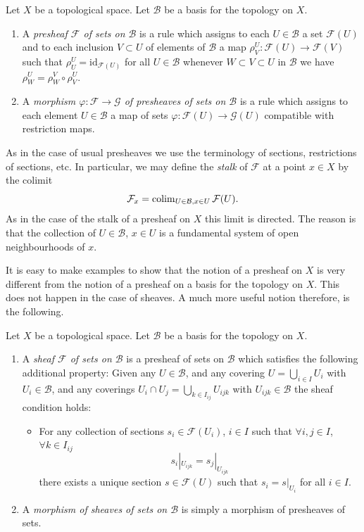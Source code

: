 \begin{definition}
\label{definition-presheaf-basis}
Let $X$ be a topological space. Let $\mathcal{B}$ be a
basis for the topology on $X$.
\begin{enumerate}
\item A {\it presheaf $\mathcal{F}$ of sets on $\mathcal{B}$}
is a rule which assigns to each $U \in \mathcal{B}$ a set
$\mathcal{F}(U)$ and to each inclusion $V \subset U$
of elements of $\mathcal{B}$ a map
$\rho^U_V : \mathcal{F}(U) \to \mathcal{F}(V)$ such that
$\rho^U_U = \text{id}_{\mathcal{F}(U)}$ for all $U \in \mathcal{B}$
whenever $W \subset V \subset U$ in $\mathcal{B}$ we have
$\rho^U_W = \rho^V_W \circ \rho ^U_V$.
\item A {\it morphism $\varphi : \mathcal{F} \to \mathcal{G}$
of presheaves of sets on $\mathcal{B}$} is a rule which assigns to each
element $U \in \mathcal{B}$ a map of sets $\varphi : \mathcal{F}(U)
\to \mathcal{G}(U)$ compatible with restriction maps.
\end{enumerate}
\end{definition}

\noindent
As in the case of usual presheaves we use the terminology of sections,
restrictions of sections, etc. In particular, we may define the
{\it stalk} of $\mathcal{F}$ at a point $x \in X$ by the
colimit
$$
\mathcal{F}_x = \mathop{\mathrm{colim}}\nolimits_{U\in \mathcal{B}, x\in U} \mathcal{F}(U).
$$
As in the case of the stalk of a presheaf on $X$ this limit is
directed. The reason is that the collection of $U\in \mathcal{B}$,
$x \in U$ is a fundamental system of open neighbourhoods of $x$.

\medskip\noindent
It is easy to make examples to show that the notion of a presheaf
on $X$ is very different from the notion of a presheaf on a basis
for the topology on $X$. This does not happen in the case of
sheaves. A much more useful notion therefore, is the following.

\begin{definition}
\label{definition-sheaf-basis}
Let $X$ be a topological space. Let $\mathcal{B}$ be a
basis for the topology on $X$.
\begin{enumerate}
\item A {\it sheaf $\mathcal{F}$ of sets on $\mathcal{B}$} is a presheaf
of sets on $\mathcal{B}$ which satisfies the following additional
property: Given any $U \in \mathcal{B}$, and any covering
$U = \bigcup_{i \in I} U_i$ with $U_i \in \mathcal{B}$, and
any coverings $U_i \cap U_j = \bigcup_{k \in I_{ij}} U_{ijk}$ with
$U_{ijk} \in \mathcal{B}$ the sheaf condition holds:
\begin{itemize}
\item[(**)] For any collection
of sections $s_i \in \mathcal{F}(U_i)$, $i \in I$ such that
$\forall i, j\in I$, $\forall k\in I_{ij}$
$$
s_i|_{U_{ijk}} = s_j|_{U_{ijk}}
$$
there exists a unique section $s \in \mathcal{F}(U)$ such that
$s_i = s|_{U_i}$ for all $i \in I$.
\end{itemize}
\item A {\it morphism of sheaves of sets on $\mathcal{B}$} is simply a
morphism of presheaves of sets.
\end{enumerate}
\end{definition}

